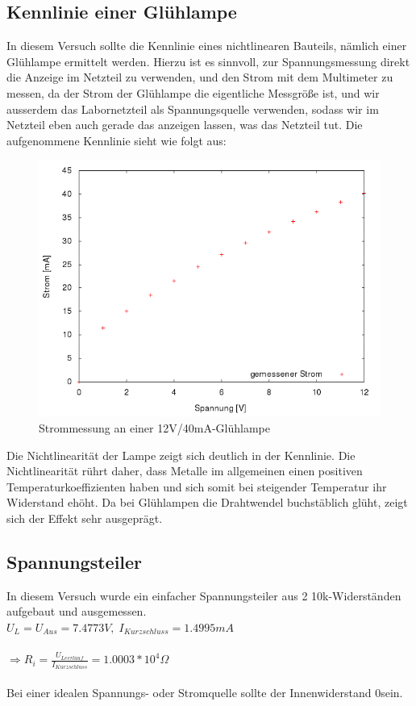 \subsection{Kennlinie einer Glühlampe}
In diesem Versuch sollte die Kennlinie eines nichtlinearen Bauteils, nämlich einer Glühlampe ermittelt werden.
Hierzu ist es sinnvoll, zur Spannungsmessung direkt die Anzeige im Netzteil zu verwenden, und den Strom mit dem Multimeter zu messen, da der Strom der Glühlampe die eigentliche Messgröße ist, und wir ausserdem das Labornetzteil als Spannungsquelle verwenden, sodass wir im Netzteil eben auch gerade das anzeigen lassen, was das Netzteil tut.
Die aufgenommene Kennlinie sieht wie folgt aus:
\begin{figure}[H] %
	\centering
	\includegraphics[width=\linewidth]{versuch1/versuch_1_2}
	\caption{Strommessung an einer 12V/40mA-Glühlampe}
\end{figure}
Die Nichtlinearität der Lampe zeigt sich deutlich in der Kennlinie. Die Nichtlinearität rührt daher, dass Metalle im allgemeinen einen positiven Temperaturkoeffizienten haben und sich somit bei steigender Temperatur ihr Widerstand ehöht. Da bei Glühlampen die Drahtwendel buchstäblich glüht, zeigt sich der Effekt sehr ausgeprägt.

\subsection{Spannungsteiler}
In diesem Versuch wurde ein einfacher Spannungsteiler aus 2 10k\Omega-Widerständen aufgebaut und ausgemessen.\\
$U_L=U_{Aus}=7.4773V,\; I_{Kurzschluss}=1.4995mA$\\\\
$\Rightarrow R_i = \frac{U_{Leerlauf}}{I_{Kurzschluss}} = 1.0003*10^{4}\Omega$\\\\
Bei einer idealen Spannungs- oder Stromquelle sollte der Innenwiderstand 0\Omega sein.

